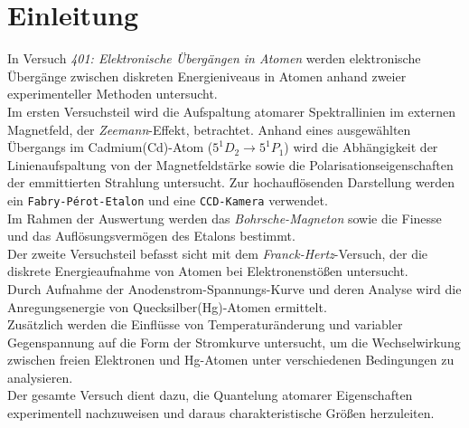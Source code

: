 \chapter{Einleitung}
In Versuch \textit{401: Elektronische Übergängen in Atomen} werden elektronische Übergänge zwischen diskreten Energieniveaus in Atomen anhand zweier experimenteller
Methoden untersucht.
\vspace{0.3cm}\\
Im ersten Versuchsteil wird die Aufspaltung atomarer Spektrallinien im externen Magnetfeld, der \textit{Zeemann}-Effekt, betrachtet. Anhand eines ausgewählten
Übergangs im Cadmium(Cd)-Atom ($5^1D_2 \rightarrow 5^1P_1$) wird die Abhängigkeit der Linienaufspaltung von der Magnetfeldstärke sowie die Polarisationseigenschaften der 
emmittierten Strahlung untersucht. Zur hochauflösenden Darstellung werden ein \texttt{Fabry-Pérot-Etalon} und eine \texttt{CCD-Kamera} verwendet.\\
Im Rahmen der Auswertung werden das \textit{Bohrsche-Magneton} sowie die Finesse und das Auflösungsvermögen des Etalons bestimmt.
\vspace{0.3cm}\\
Der zweite Versuchsteil befasst sicht mit dem  \textit{Franck-Hertz}-Versuch, der die diskrete Energieaufnahme von Atomen bei Elektronenstößen untersucht.\\
Durch Aufnahme der Anodenstrom-Spannungs-Kurve und deren Analyse wird die Anregungsenergie von Quecksilber(Hg)-Atomen ermittelt.\\
Zusätzlich werden die Einflüsse von Temperaturänderung und variabler Gegenspannung auf die Form der Stromkurve untersucht, um die Wechselwirkung zwischen freien Elektronen und Hg-Atomen
unter verschiedenen Bedingungen zu analysieren.
\vspace{0.3cm}\\
Der gesamte Versuch dient dazu, die Quantelung atomarer Eigenschaften experimentell nachzuweisen und daraus charakteristische Größen herzuleiten.

